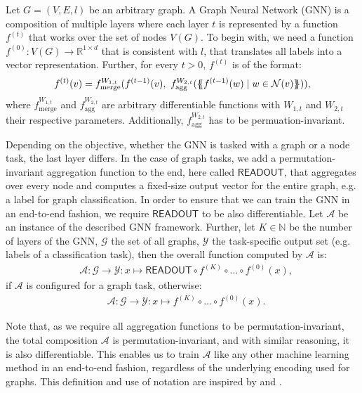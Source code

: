 \begin{definition}
    Let $G = (V, E, l)$ be an arbitrary graph. A Graph Neural Network (GNN) is a composition of multiple layers where each layer $t$ is represented by a function $f^{(t)}$ that works over the set of nodes $V(G)$. To begin with, we need a function $f^{(0)}: V(G) \rightarrow \mathbb{R}^{1 \times d}$ that is consistent with $l$, that translates all labels into a vector representation. Further, for every $t > 0$, $f^{(t)}$ is of the format:
    \begin{align*}
    f^{(t)}(v) = f^{W_{1,t}}_{\text{merge}} (f^{(t-1)}(v), \  f^{W_{2,t}}_{\text{agg}}( \{\!\!\{ f^{(t-1)}(w) \mid w \in \mathcal{N}(v) \}\!\!\} )),
    \end{align*}
    where $f^{W_{1,t}}_{\text{merge}}$ and $f^{W_{2,t}}_{\text{agg}}$ are arbitrary differentiable functions with $W_{1,t}$ and $W_{2,t}$ their respective parameters. Additionally, $f^{W_{2,t}}_{\text{agg}}$ has to be permuation-invariant.

    Depending on the objective, whether the GNN is tasked with a graph or a node task, the last layer differs. In the case of graph tasks, we add a permutation-invariant aggregation function to the end, here called $\textsf{READOUT}$, that aggregates over every node and computes a fixed-size output vector for the entire graph, e.g. a label for graph classification. In order to ensure that we can train the GNN in an end-to-end fashion, we require $\textsf{READOUT}$ to be also differentiable. Let $\mathcal{A}$ be an instance of the described GNN framework. Further, let $K \in \mathbb{N}$ be the number of layers of the GNN, $\mathcal{G}$ the set of all graphs, $\mathcal{Y}$ the task-specific output set (e.g. labels of a classification task), then the overall function computed by $\mathcal{A}$ is:
    \begin{align*}
        &\mathcal{A}: \mathcal{G} \rightarrow \mathcal{Y}: x \mapsto \textsf{READOUT} \circ f^{(K)} \circ \ldots \circ f^{(0)}(x),
    \end{align*}
    if $\mathcal{A}$ is configured for a graph task, otherwise:
    \begin{align*}
        &\mathcal{A}: \mathcal{G} \rightarrow \mathcal{Y}: x \mapsto f^{(K)} \circ \ldots \circ f^{(0)}(x).
    \end{align*}
\end{definition}

Note that, as we require all aggregation functions to be permutation-invariant, the total composition $\mathcal{A}$ is permutation-invariant, and with similar reasoning, it is also differentiable. This enables us to train $\mathcal{A}$ like any other machine learning method in an end-to-end fashion, regardless of the underlying encoding used for graphs. This definition and use of notation are inspired by \cite{Morris2018} and \cite{Xu2018}.

